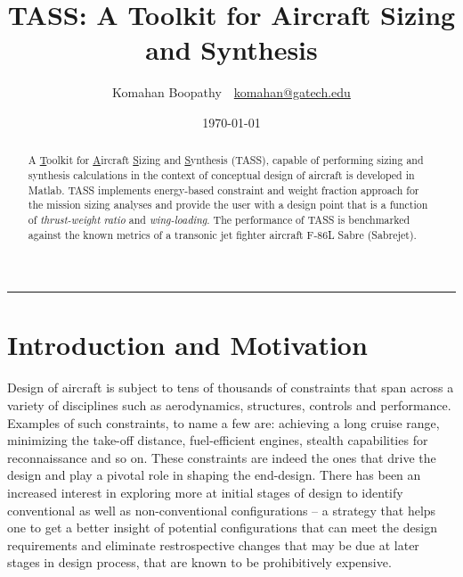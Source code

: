 \documentclass[pdftex,11pt,letter]{article}
\title{\textbf{\textsc{TASS}: A Toolkit for Aircraft Sizing and Synthesis}}
\author{Komahan Boopathy~~\url{komahan@gatech.edu}} \date{\today}
\begin{document}
\maketitle
\vspace{-0.25in}
\rule{\linewidth}{2pt}

\begin{abstract}
A  \ul{T}oolkit for \ul{A}ircraft \ul{S}izing and \ul{S}ynthesis (TASS), capable of performing sizing and synthesis calculations  in the context of conceptual design of aircraft is developed in Matlab\cite{MATLAB}. TASS implements energy-based constraint and weight fraction approach for the mission sizing analyses and provide the user with a design point that is a function of \emph{thrust-weight ratio} and \emph{wing-loading}.  The performance of TASS is benchmarked against the known metrics of a transonic jet fighter aircraft F-86L Sabre (Sabrejet).
\end{abstract}

\section{Introduction and Motivation}

Design of aircraft is subject to tens of thousands of constraints that span across a variety of disciplines such as aerodynamics, structures, controls and performance\cite{NicolaiText,FieldingText,HoweText,RaymerText}. Examples of such constraints, to name a few are: achieving a long cruise range, minimizing the take-off distance, fuel-efficient engines, stealth capabilities for reconnaissance and so on. These constraints are indeed the ones that drive the design and play a pivotal role in shaping the end-design. There has been an increased interest in exploring more at initial stages of design to identify conventional as well as non-conventional configurations -- a strategy that helps one to get a better insight of potential configurations that can meet the design requirements and eliminate restrospective changes that may be due at later stages in design process, that are known to be prohibitively expensive. 
\end{document}
